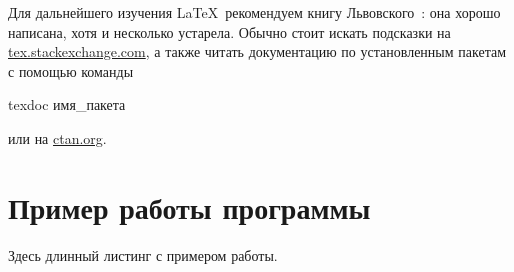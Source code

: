 Для дальнейшего изучения \LaTeX\ рекомендуем книгу Львовского~\autocite{Lvo2003}: она хорошо написана, хотя и несколько устарела.
Обычно стоит искать подсказки на
\href{http://tex.stackexchange.com/}{tex.stackexchange.com}, а также
читать документацию по установленным пакетам с помощью
команды
\begin{Verb}
texdoc имя_пакета
\end{Verb}
или на \href{http://ctan.org/}{ctan.org}.

\printbibliography[%
    heading=bibintoc%
]

\appendix
{}

\section{Пример работы программы}

Здесь длинный листинг с примером работы.
\fi


